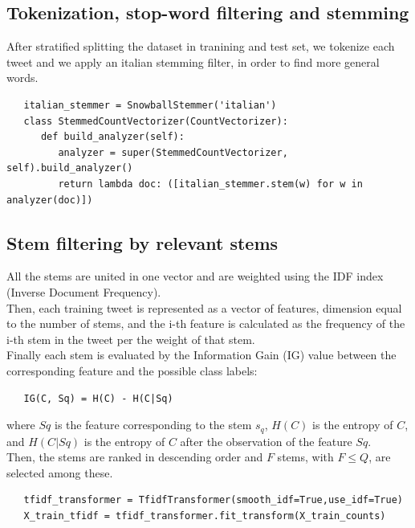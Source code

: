 \documentclass[a4paper]{article}
\begin{document}
\subsection{Tokenization, stop-word filtering and stemming}
After stratified splitting the dataset in tranining and test set, we tokenize each tweet and we apply an italian stemming filter, in order to find more general words.
\begin{verbatim}
   italian_stemmer = SnowballStemmer('italian')
   class StemmedCountVectorizer(CountVectorizer):
      def build_analyzer(self):
         analyzer = super(StemmedCountVectorizer, self).build_analyzer()
         return lambda doc: ([italian_stemmer.stem(w) for w in analyzer(doc)])
\end{verbatim}

\subsection{Stem filtering by relevant stems}
All the stems are united in one vector and are weighted using the IDF index (Inverse Document Frequency).\\
Then, each training tweet is represented as a vector of features, dimension equal to the number of stems, and the i-th feature is calculated as the frequency of the i-th stem in the tweet per the weight of that stem.\\
Finally each stem is evaluated by the Information Gain (IG) value between the corresponding feature and the possible class labels:
\begin{verbatim}
   IG(C, Sq) = H(C) - H(C|Sq)
\end{verbatim}
where $Sq$ is the feature corresponding to the stem $s_q$, $H(C)$ is the entropy of $C$, and $H(C|Sq)$ is the entropy of $C$ after the observation of the feature $Sq$.\\
Then, the stems are ranked in descending order and $F$ stems, with $F \leq Q$, are selected among these.
\begin{verbatim}
   tfidf_transformer = TfidfTransformer(smooth_idf=True,use_idf=True)
   X_train_tfidf = tfidf_transformer.fit_transform(X_train_counts)
\end{verbatim}
\end{document}
